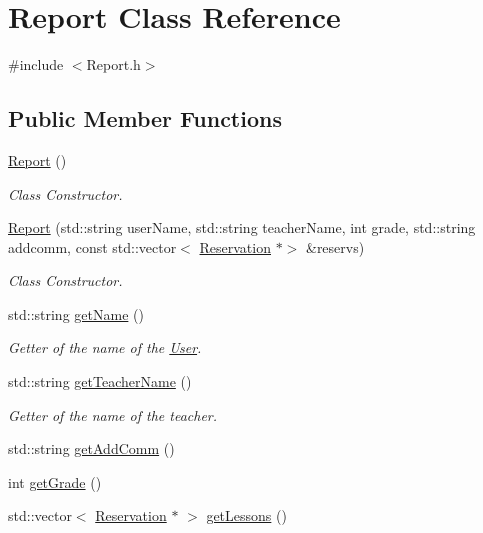\hypertarget{class_report}{}\section{Report Class Reference}
\label{class_report}


{\ttfamily \#include $<$Report.\+h$>$}

\subsection*{Public Member Functions}
\begin{DoxyCompactItemize}
\item 
\mbox{\hyperlink{class_report_ae3150817fcf4ebf814358baf5bd72e8f}{Report}} ()
\begin{DoxyCompactList}\small\item\em Class Constructor. \end{DoxyCompactList}\item 
\mbox{\hyperlink{class_report_a0354159ad666bbe9a6166938dcb0b5ca}{Report}} (std\+::string user\+Name, std\+::string teacher\+Name, int grade, std\+::string addcomm, const std\+::vector$<$ \mbox{\hyperlink{class_reservation}{Reservation}} $\ast$$>$ \&reservs)
\begin{DoxyCompactList}\small\item\em Class Constructor. \end{DoxyCompactList}\item 
std\+::string \mbox{\hyperlink{class_report_aaeac48b6c10c5bbf240fc518b6d45d05}{get\+Name}} ()
\begin{DoxyCompactList}\small\item\em Getter of the name of the \mbox{\hyperlink{class_user}{User}}. \end{DoxyCompactList}\item 
std\+::string \mbox{\hyperlink{class_report_af7c52b70f5fe6feae64e44affa6095cd}{get\+Teacher\+Name}} ()
\begin{DoxyCompactList}\small\item\em Getter of the name of the teacher. \end{DoxyCompactList}\item 
std\+::string \mbox{\hyperlink{class_report_aea25a47f972d0048ae7f788218636c65}{get\+Add\+Comm}} ()
\item 
int \mbox{\hyperlink{class_report_a56fcac206c401ebc51d35fbe907ad729}{get\+Grade}} ()
\item 
std\+::vector$<$ \mbox{\hyperlink{class_reservation}{Reservation}} $\ast$ $>$ \mbox{\hyperlink{class_report_a2915547d50dfefb1eae33f12ed0942d8}{get\+Lessons}} ()
$$
\end{DoxyCompactItemize}

